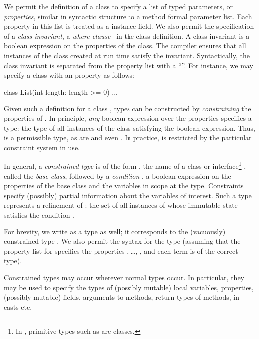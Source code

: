 We permit the definition of a class  to specify
a list of typed parameters, or {\em properties},
 similar in syntactic structure to
a method formal parameter list.
%
Each property in this list is treated as  a   instance field.
%
We also permit the
specification of a {\em class invariant}, a
{\em where clause}~\cite{where-clauses}
in the class definition. A class invariant
is a boolean expression on the properties of the class.
The compiler ensures that all
instances of the class created at run time satisfy the invariant.
%
Syntactically, the class invariant is separated from the
property list with a ``\xcd{:}''. 
%
For instance, we may specify a class  with an
 property as follows:
\begin{displayxten}
    class List(int length: length >= 0) {...}
\end{displayxten}
Given such a definition for a class , types can be
constructed by {\em constraining} the properties of .  In
principle, {\em any} boolean expression over the properties
specifies a type: the type of all instances of the class
satisfying the boolean expression. Thus, 
is a permissible type, as are  and
even .
In practice,  is restricted by the particular constraint
system in use.

In general, a {\em constrained type} is of the form ,
the name of a class or interface\footnote{In \Xten{}, primitive types such as  are classes.} , called the {\em base class}, followed
by a {\em condition} ,
a boolean expression on the properties of the
base class and the  variables in scope at the type.
Constraints specify (possibly) partial information about the
variables of interest.
Such a type represents a refinement of : the set of all
instances of  whose immutable state satisfies the
condition .

For brevity, we write  as a type as well; it
corresponds to the (vacuously) constrained type .
We also permit the syntax  for
the type  (assuming that
the property list for  specifies the  properties
, \ldots, , and each term  is of the correct
type).

Constrained types may occur wherever normal types occur. In
particular, they may be used to specify the types of (possibly
mutable) local variables, properties, (possibly mutable) fields,
arguments to methods, return types of methods, in casts etc.

